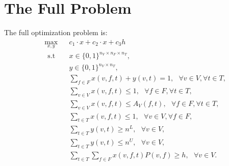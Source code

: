\documentclass[12pt]{article}
\theoremstyle{definition}
\newtheorem{definition set}{Definition Set}%
\newtheorem{problem statement}{Problem Statement} %
\theoremstyle{remark}
\theoremstyle{remark}
\begin{document}
\section{The Full Problem}
The full optimization problem is:
\begin{equation}
\begin{aligned}
&\max_{x,y} && c_1 \cdot x + c_2 \cdot x + c_3 h\\
&\ \ \text{s.t} && x \in \{0,1\}^{n_V \times n_F \times n_T}, \\
& && y \in \{0,1\}^{n_V \times n_T}, \\
& && \sum_{f \in F} x(v,f,t) + y(v,t) = 1, \ \ \ \forall v \in V, \forall t \in T, \\
& && \sum_{v \in V} x(v,f,t) \leq 1, \ \ \ \forall f \in F, \forall t \in T, \\
& && \sum_{v \in V} x(v,f,t) \leq A_V(f,t), \ \ \ \forall f \in F, \forall t \in T, \\
& && \sum_{t \in T} x(v,f,t) \leq 1, \ \ \ \forall v \in V, \forall f \in F, \\
& && \sum_{t \in T} y(v,t) \geq n^L, \ \ \ \forall v \in V, \\
& && \sum_{t \in T} y(v,t) \leq n^U, \ \ \ \forall v \in V, \\
& && \sum_{t \in T} \sum_{f \in F} x(v,f,t) P(v,f) \geq h, \ \ \ \forall v \in V.
\end{aligned}
\end{equation}
\end{document}
